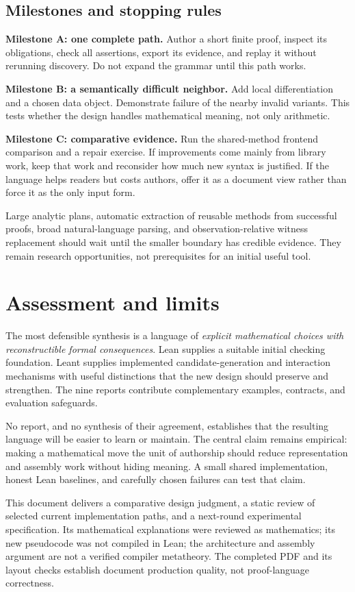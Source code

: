 \documentclass[11pt,letterpaper]{article}
\begin{document}
\subsection{Milestones and stopping rules}
\textbf{Milestone A: one complete path.} Author a short finite proof, inspect its
obligations, check all assertions, export its evidence, and replay it without
rerunning discovery. Do not expand the grammar until this path works.

\textbf{Milestone B: a semantically difficult neighbor.} Add local differentiation
and a chosen data object. Demonstrate failure of the nearby invalid variants.
This tests whether the design handles mathematical meaning, not only arithmetic.

\textbf{Milestone C: comparative evidence.} Run the shared-method frontend comparison
and a repair exercise. If improvements come mainly from library work, keep that
work and reconsider how much new syntax is justified. If the language helps
readers but costs authors, offer it as a document view rather than force it as
the only input form.

Large analytic plans, automatic extraction of reusable methods from successful
proofs, broad natural-language parsing, and observation-relative witness
replacement should wait until the smaller boundary has credible evidence.
They remain research opportunities, not prerequisites for an initial useful tool.

\section{Assessment and limits}
The most defensible synthesis is a language of \emph{explicit mathematical choices
with reconstructible formal consequences}. Lean supplies a suitable initial
checking foundation. Leant supplies implemented candidate-generation and
interaction mechanisms with useful distinctions that the new design should
preserve and strengthen. The nine reports contribute complementary examples,
contracts, and evaluation safeguards.

No report, and no synthesis of their agreement, establishes that the resulting
language will be easier to learn or maintain. The central claim remains empirical:
making a mathematical move the unit of authorship should reduce representation
and assembly work without hiding meaning. A small shared implementation, honest
Lean baselines, and carefully chosen failures can test that claim.

This document delivers a comparative design judgment, a static review of selected
current implementation paths, and a next-round experimental specification. Its
mathematical explanations were reviewed as mathematics; its new pseudocode was
not compiled in Lean; the architecture and assembly argument are not a verified
compiler metatheory. The completed PDF and its layout checks establish document
production quality, not proof-language correctness.
\end{document}
